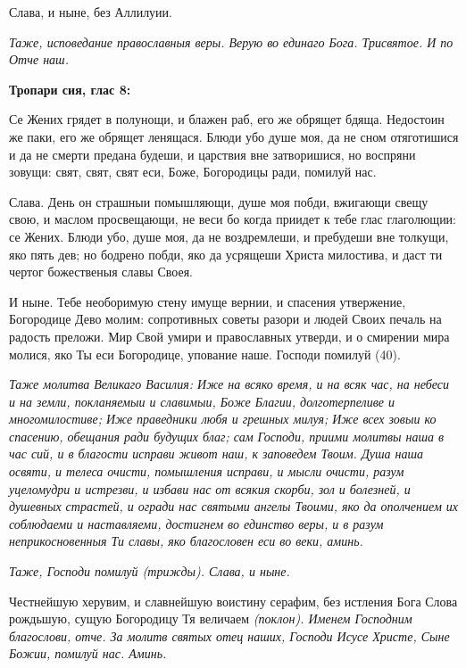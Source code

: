 Слава, и ныне, без Аллилуии.


\itshape Таже, исповедание православныя веры.\normalfont{} Верую во единаго Бога. Трисвятое. И по Отче наш.





\bfseries Тропари сия, глас 8:\normalfont{}


Се Жених грядет в полунощи, и блажен раб, его же обрящет бдяща. Недостоин же паки, его же обрящет ленящася. Блюди убо душе моя, да не сном отяготишися и да не смерти предана будеши, и царствия вне затворишися, но воспряни зовущи: свят, свят, свят еси, Боже, Богородицы ради, помилуй нас.


Слава. День он страшныи помышляющи, душе моя побди, вжигающи свещу свою, и маслом просвещающи, не веси бо когда приидет к тебе глас глаголющии: се Жених. Блюди убо, душе моя, да не воздремлеши, и пребудеши вне толкущи, яко пять дев; но бодрено побди, яко да усрящеши Христа милостива, и даст ти чертог божественыя славы Своея.


И ныне. Тебе необоримую стену имуще вернии, и спасения утвержение, Богородице Дево молим: сопротивных советы разори и людей Своих печаль на радость преложи. Мир Свой умири и православных утверди, и о смирении мира молися, яко Ты еси Богородице, упование наше. Господи помилуй (40).


\itshape Таже молитва Великаго Василия:\normalfont{} Иже на всяко время, и на всяк час, на небеси и на земли, покланяемыи и славимыи, Боже Благии, долготерпеливе и многомилостиве; Иже праведники любя и грешных милуя; Иже всех зовыи ко спасению, обещания ради будущих благ; сам Господи, приими молитвы наша в час сий, и в благости исправи живот наш, к заповедем Твоим. Душа наша освяти, и телеса очисти, помышления исправи, и мысли очисти, разум уцеломудри и истрезви, и избави нас от всякия скорби, зол и болезней, и душевных страстей, и огради нас святыми ангелы Твоими, яко да ополчением их соблюдаеми и наставляеми, достигнем во единство веры, и в разум неприкосновенныя Ти славы, яко благословен еси во веки, аминь.


\itshape Таже, Господи помилуй\normalfont{} \itshape (трижды)\normalfont{}. Слава, и ныне.


Честнейшую херувим, и славнейшую воистину серафим, без истления Бога Слова рождьшую, сущую Богородицу Тя величаем \itshape (поклон)\normalfont{}. Именем Господним благослови, отче. За молитв святых отец наших, Господи Исусе Христе, Сыне Божии, помилуй нас. Аминь.


